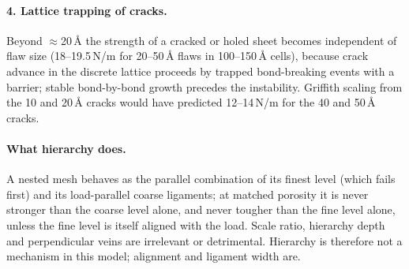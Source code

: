 \paragraph{4. Lattice trapping of cracks.} Beyond $\approx$20\,\AA{} the strength of a cracked or holed sheet becomes independent of flaw size (18--19.5\,N/m for 20--50\,\AA{} flaws in 100--150\,\AA{} cells), because crack advance in the discrete lattice proceeds by trapped bond-breaking events with a barrier; stable bond-by-bond growth precedes the instability. Griffith scaling from the 10 and 20\,\AA{} cracks would have predicted 12--14\,N/m for the 40 and 50\,\AA{} cracks.

\paragraph{What hierarchy does.} A nested mesh behaves as the parallel combination of its finest level (which fails first) and its load-parallel coarse ligaments; at matched porosity it is never stronger than the coarse level alone, and never tougher than the fine level alone, unless the fine level is itself aligned with the load. Scale ratio, hierarchy depth and perpendicular veins are irrelevant or detrimental. Hierarchy is therefore not a mechanism in this model; alignment and ligament width are.

